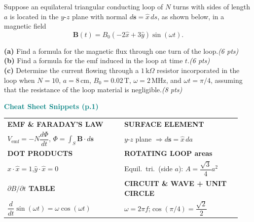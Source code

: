 \documentclass[11pt,letterpaper]{article}
\begin{document}
\begin{qbox}
Suppose an equilateral triangular conducting loop of $N$ turns with sides of length $a$ is located in the $y$-$z$ plane with normal $d\mathbf{s}=\hat{x}\,ds$, as shown below, in a magnetic field
\[
\mathbf{B}(t)=B_0(-2\hat{x}+3\hat{y})\sin(\omega t).
\]
\begin{center}
\end{center}
\textbf{(a)} Find a formula for the magnetic flux through one turn of the loop.\hfill\textit{(6 pts)}\\[3pt]
\textbf{(b)} Find a formula for the emf induced in the loop at time $t$.\hfill\textit{(6 pts)}\\[3pt]
\textbf{(c)} Determine the current flowing through a $1\,\text{k}\Omega$ resistor incorporated in the loop when $N=10$, $a=8\,\text{cm}$, $B_0=0.02\,\text{T}$, $\omega=2\,\text{MHz}$, and $\omega t=\pi/4$, assuming that the resistance of the loop material is negligible.\hfill\textit{(8 pts)}
\end{qbox}

\begin{cssnip}
\textbf{\small\textcolor{teal}{Cheat Sheet Snippets (p.1)}}\\[3pt]
\begin{tabular}{@{}p{0.47\linewidth}p{0.47\linewidth}@{}}
\textbf{EMF \& FARADAY'S LAW} & \textbf{SURFACE ELEMENT}\\
$V_\text{emf}=-N\dfrac{d\Phi}{dt}$,\; $\Phi=\displaystyle\int_S\mathbf{B}\cdot d\mathbf{s}$ &
$y$-$z$ plane $\Rightarrow d\mathbf{s}=\hat{x}\,da$\\[5pt]
\textbf{DOT PRODUCTS} & \textbf{ROTATING LOOP areas}\\
$\hat{x}\cdot\hat{x}=1$,\quad $\hat{y}\cdot\hat{x}=0$ & Equil.\ tri.\ (side $a$): $A=\dfrac{\sqrt{3}}{4}a^2$\\[5pt]
\textbf{$\partial B/\partial t$ TABLE} & \textbf{CIRCUIT \& WAVE + UNIT CIRCLE}\\
$\dfrac{d}{dt}\sin(\omega t)=\omega\cos(\omega t)$ & $\omega=2\pi f$;\quad $\cos(\pi/4)=\dfrac{\sqrt{2}}{2}$\\
\end{tabular}
\end{cssnip}
\end{document}
